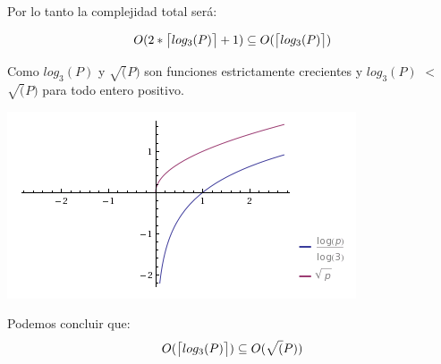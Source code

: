 Por lo tanto la complejidad total será:

\begin{equation}
O(2 \ast \ceil[\big]{log_3(P)} + 1) \subseteq O(\ceil[\big]{log_3(P)})
\end{equation}

Como $log_3(P)$ y $\sqrt(P)$ son funciones estrictamente crecientes y $log_3(P)$ $<$ $\sqrt(P)$ para todo entero positivo.\\

\vspace*{0.3cm} \vspace*{0.3cm}
  \begin{center}
\includegraphics[scale=0.65]{./EJ2/imgpsh_fullsize.png}
  \end{center}
  \vspace*{0.3cm}
  
Podemos concluir que:\\

\begin{equation}
O(\ceil[\big]{log_3(P)}) \subseteq O(\sqrt(P))
\end{equation}
